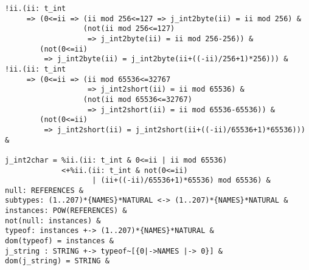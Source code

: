 \begin{verbatim}
!ii.(ii: t_int 
     => (0<=ii => (ii mod 256<=127 => j_int2byte(ii) = ii mod 256) & 
                  (not(ii mod 256<=127) 
                   => j_int2byte(ii) = ii mod 256-256)) & 
        (not(0<=ii) 
         => j_int2byte(ii) = j_int2byte(ii+((-ii)/256+1)*256))) & 
!ii.(ii: t_int 
     => (0<=ii => (ii mod 65536<=32767 
                   => j_int2short(ii) = ii mod 65536) & 
                  (not(ii mod 65536<=32767) 
                   => j_int2short(ii) = ii mod 65536-65536)) & 
        (not(0<=ii) 
         => j_int2short(ii) = j_int2short(ii+((-ii)/65536+1)*65536))) & 

j_int2char = %ii.(ii: t_int & 0<=ii | ii mod 65536)
             <+%ii.(ii: t_int & not(0<=ii) 
                    | (ii+((-ii)/65536+1)*65536) mod 65536) & 
null: REFERENCES & 
subtypes: (1..207)*{NAMES}*NATURAL <-> (1..207)*{NAMES}*NATURAL & 
instances: POW(REFERENCES) & 
not(null: instances) & 
typeof: instances +-> (1..207)*{NAMES}*NATURAL & 
dom(typeof) = instances & 
j_string : STRING +-> typeof~[{0|->NAMES |-> 0}] &
dom(j_string) = STRING &
\end{verbatim}
